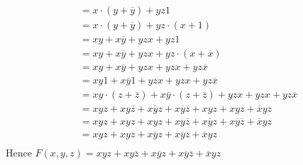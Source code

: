 \documentclass[12pt letter]{report}
\begin{document}
{\begin{enumerate}
\begin{align*}
                                     & = x\cdot \left( y + \overline{y} \right) + yz1 \tag*{Unit Property}                                  \\
                                     & = x \cdot \left( y + \overline{y} \right) + yz \cdot \left( x+ 1 \right) \tag*{First Domination Law} \\
                                     & = xy + x\overline{y} + yzx + yz1 \tag*{Second Distributive Law}                                      \\
                                     & = xy + x\overline{y} + yzx + yz \cdot \left( x + \overline{x} \right) \tag*{Unit
            Property}                                                                                                                       \\
                                     & = xy +x\overline{y} + yzx + yzx + yz\overline{x} \tag*{Second Distributive Law}                      \\
                                     & = xy1 + x\overline{y}1 + yzx + yzx + yz\overline{x} \tag*{Second Identity Law}                       \\
                                     & = xy \cdot \left( z + \overline{z} \right) + x\overline{y} \cdot \left( z +
            \overline{z} \right) + yzx + yzx + yz\overline{x} \tag*{Unit Property}                                                          \\
                                     & = xyz + xy\overline{z} + x\overline{y}z + x\overline{y}\overline{z} + xyz + xyz + \overline{x}yz
            \tag*{Second Distributive Law}                                                                                                  \\
                                     & = xyz + xyz + xyz + xy\overline{z} + x\overline{y}z + x\overline{y}\overline{z} + \overline{x}yz
            \tag*{First Commutative Law}                                                                                                    \\
                                     & = xyz + xy\overline{z}+ x\overline{y}z + x\overline{y}\overline{z} + \overline{x}yz                  \\
          \end{align*}
          Hence $F \left( x, y, z \right) = xyz + xy\overline{z} + x\overline{y}z + x\overline{y}\overline{z} +
            \overline{x}yz $
  \end{enumerate}
}
\end{document}
